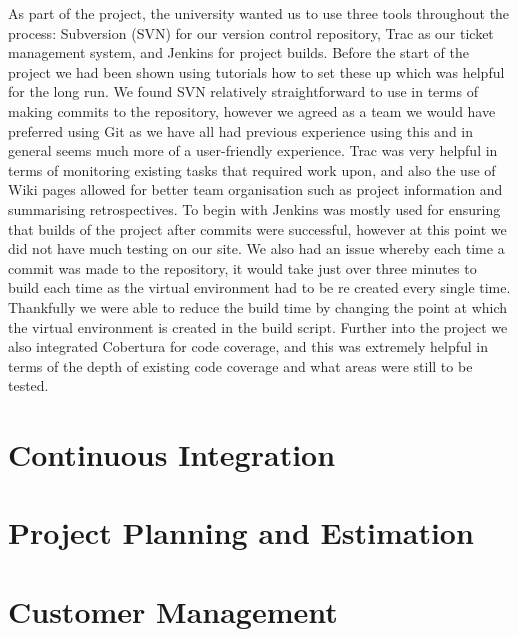 \documentclass{l3proj}
\begin{document}
As part of the project, the university wanted us to use three tools throughout the process: Subversion (SVN) for our version control
repository, Trac as our ticket management system, and Jenkins for project builds. Before the start of the project we had been
shown using tutorials how to set these up which was helpful for the long run. We found SVN relatively straightforward to use
in terms of making commits to the repository, however we agreed as a team we would have preferred using Git as we have all
had previous experience using this and in general seems much more of a user-friendly experience. Trac was very helpful in
terms of monitoring existing tasks that required work upon, and also the use of Wiki pages allowed for better team organisation
such as project information and summarising retrospectives. To begin with Jenkins was mostly used for ensuring that builds of
the project after commits were successful, however at this point we did not have much testing on our site. We also had an issue
whereby each time a commit was made to the repository, it would take just over three minutes to build each time as the virtual
environment had to be re created every single time. Thankfully we were able to reduce the build time by changing the point at
which the virtual environment is created in the build script. Further into the project we also integrated Cobertura for code
coverage, and this was extremely helpful in terms of the depth of existing code coverage and what areas were still to be tested.




\section{Continuous Integration}
\label{sec:continuous-integration}




\section{Project Planning and Estimation}
\label{sec:planning}




\section{Customer Management}
\label{sec:customer-management}
\end{document}
